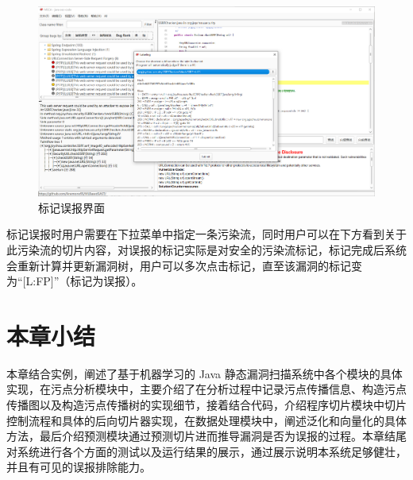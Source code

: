 \begin{figure}[H]
    \centering
    \includegraphics[width=0.8\linewidth]{FIGs/chapter4/labelFP.png}
    \caption{标记误报界面}\label{show:labelFP}
\end{figure}


标记误报时用户需要在下拉菜单中指定一条污染流，同时用户可以在下方看到关于此污染流的切片内容，对误报的标记实际是对安全的污染流标记，标记完成后系统会重新计算并更新漏洞树，用户可以多次点击标记，直至该漏洞的标记变为“[L:FP]”（标记为误报）。

\section{本章小结}

本章结合实例，阐述了基于机器学习的 Java 静态漏洞扫描系统中各个模块的具体实现，在污点分析模块中，主要介绍了在分析过程中记录污点传播信息、构造污点传播图以及构造污点传播树的实现细节，接着结合代码，介绍程序切片模块中切片控制流程和具体的后向切片器实现，在数据处理模块中，阐述泛化和向量化的具体方法，最后介绍预测模块通过预测切片进而推导漏洞是否为误报的过程。本章结尾对系统进行各个方面的测试以及运行结果的展示，通过展示说明本系统足够健壮，并且有可见的误报排除能力。

